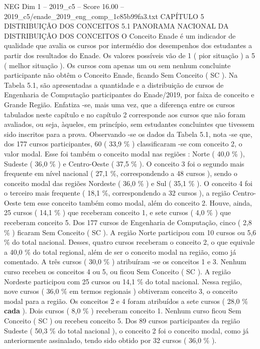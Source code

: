 \begin{textsample}{NEG Dim 1 – 2019\_c5 – Score 16.00 – 2019\_c5/enade\_2019\_eng\_comp\_1c85b99fa3.txt}  \label{ex:f1_neg_397}
CAPÍTULO 5 DISTRIBUIÇÃO DOS CONCEITOS 5.1 PANORAMA NACIONAL DA DISTRIBUIÇÃO DOS CONCEITOS O Conceito Enade é um indicador de qualidade que avalia os cursos por intermédio dos desempenhos dos estudantes a partir dos resultados do Enade.
Os valores possíveis vão de 1 ( pior situação ) a 5 ( melhor situação ).
Os cursos com apenas um ou sem nenhum concluinte participante não obtêm o Conceito Enade, ficando Sem Conceito ( SC ).
Na Tabela 5.1, são apresentadas a quantidade e a distribuição de cursos de Engenharia de Computação participantes do Enade/2019, por faixa de conceito e Grande Região.
Enfatiza -se, mais uma vez, que a diferença entre os cursos tabulados neste capítulo e no capítulo 2 corresponde aos cursos que não foram avaliados, ou seja, àqueles, em princípio, sem estudantes concluintes que tivessem sido inscritos para a prova.
Observando -se os dados da Tabela 5.1, nota -se que, dos 177 cursos participantes, 60 ( 33,9 \% ) classificaram -se com conceito 2, o valor modal.
Esse foi também o conceito modal nas regiões : Norte ( 40,0 \% ), Sudeste ( 36,0 \% ) e Centro-Oeste ( 37,5 \% ).
O conceito 3 foi o segundo mais frequente em nível nacional ( 27,1 \%, correspondendo a 48 cursos ), sendo o conceito modal das regiões Nordeste ( 36,0 \% ) e Sul ( 35,1 \% ).
O conceito 4 foi o terceiro mais frequente ( 18,1 \%, correspondendo a 32 cursos ), a região Centro-Oeste tem esse conceito também como modal, além do conceito 2.
Houve, ainda, 25 cursos ( 14,1 \% ) que receberam conceito 1, e sete cursos ( 4,0 \% ) que receberam conceito 5.
Dos 177 cursos de Engenharia de Computação, cinco ( 2,8 \% ) ficaram Sem Conceito ( SC ).
A região Norte participou com 10 cursos ou 5,6 \% do total nacional.
Desses, quatro cursos receberam o conceito 2, o que equivale a 40,0 \% do total regional, além de ser o conceito modal na região, como já comentado.
A três cursos ( 30,0 \% ) atribuíram -se os conceitos 1 e 3.
Nenhum curso recebeu os conceitos 4 ou 5, ou ficou Sem Conceito ( SC ).
A região Nordeste participou com 25 cursos ou 14,1 \% do total nacional.
Nessa região, nove cursos ( 36,0 \% em termos regionais ) obtiveram conceito 3, o conceito modal para a região.
Os conceitos 2 e 4 foram atribuídos a sete cursos ( 28,0 \% \textbf{cada} ).
Dois cursos ( 8,0 \% ) receberam conceito 1.
Nenhum curso ficou Sem Conceito ( SC ) ou recebeu conceito 5.
Dos 89 cursos participantes da região Sudeste ( 50,3 \% do total nacional ), o conceito 2 foi o conceito modal, como já anteriormente assinalado, tendo sido obtido por 32 cursos ( 36,0 \% ).

\end{textsample}
